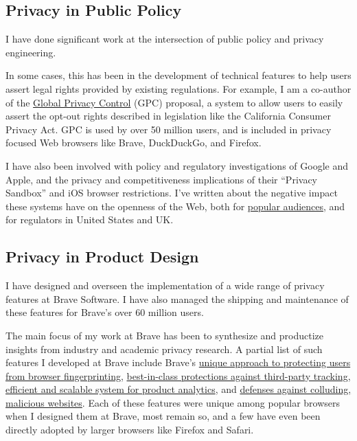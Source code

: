 \documentclass[wideaddress]{vitae}
\begin{document}
  \subsection{Privacy in Public Policy}
  \begin{description}
    \item{\noindent I have done significant work at the intersection of public
    policy and privacy engineering.}

    \item{\noindent In some cases, this has been in the development
    of technical features to help users assert legal rights provided by existing regulations.
    For example, I am a co-author of the \href{https://globalprivacycontrol.org/}{Global Privacy Control} (GPC)
    proposal, a system to allow users to easily
    assert the opt-out rights described in legislation like the California Consumer Privacy Act.
    GPC is used by over 50 million users, and is included in privacy focused
    Web browsers like Brave, DuckDuckGo, and Firefox.}

    \item{\noindent I have also been involved with policy and regulatory
    investigations of Google and Apple, and the privacy and competitiveness
    implications of their ``Privacy Sandbox'' and iOS browser restrictions.
    I've written about the negative impact these
    systems have on the openness of the Web, both for \href{https://brave.com/web-standards-at-brave/}{popular audiences},
    and for regulators in United States and UK.}
  \end{description}

  \subsection{Privacy in Product Design}
  \begin{description}
    \item{\noindent I have designed and overseen the implementation of a wide
    range of privacy features at Brave Software. I have also managed
    the shipping and maintenance of these features for Brave's over 60 million users.}

    \item{\noindent The main focus of my work at Brave has been to synthesize and productize
    insights from industry and academic privacy research. A partial
    list of such features I developed at Brave include Brave's
    \href{https://brave.com/privacy-updates/3-fingerprint-randomization/}{unique approach to protecting users from browser fingerprinting},
    \href{https://brave.com/privacy-updates/7-ephemeral-storage/}{best-in-class protections against third-party tracking},
    \href{https://brave.com/privacy-updates/19-star/}{efficient and scalable system for product analytics}, and
    \href{https://brave.com/privacy-updates/13-pool-party-side-channels/}{defenses against colluding, malicious websites}.
    Each of these features were unique among popular browsers when I designed
    them at Brave, most remain so, and a few have even been directly adopted by larger
    browsers like Firefox and Safari.}
  \end{description}
\end{document}
